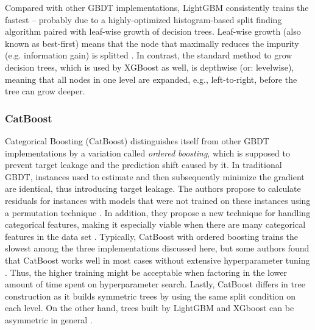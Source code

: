 Compared with other GBDT implementations, LightGBM consistently trains the fastest \parencite[1951--1954]{bentejac_comparative_2021} -- probably due to a highly-optimized histogram-based split finding algorithm paired with leaf-wise growth of decision trees. Leaf-wise growth (also known as best-first) means that the node that maximally reduces the impurity (e.g. information gain) is splitted \parencite[3]{shi_best-first_2007}. In contrast, the standard method to grow decision trees, which is used by XGBoost as well, is depthwise (or: levelwise), meaning that all nodes in one level are expanded, e.g., left-to-right, before the tree can grow deeper. 

\subsubsection{CatBoost}

Categorical Boosting (CatBoost) distinguishes itself from other GBDT implementations by a variation called \textit{ordered boosting}, which is supposed to prevent target leakage and the prediction shift caused by it. In traditional GBDT, instances used to estimate and then subsequently minimize the gradient are identical, thus introducing target leakage. The authors propose to calculate residuals for instances with models that were not trained on these instances using a permutation technique \parencites[5]{prokhorenkova_catboost_2017}[1943--1944]{bentejac_comparative_2021}. In addition, they propose a new technique for handling categorical features, making it especially viable when there are many categorical features in the data set \parencite[1]{prokhorenkova_catboost_2017}. Typically, CatBoost with ordered boosting trains the slowest among the three implementations discussed here, but some authors found that CatBoost works well in most cases without extensive hyperparameter tuning \parencite[26]{florek_benchmarking_2023}. Thus, the higher training might be acceptable when factoring in the lower amount of time spent on hyperparameter search. Lastly, CatBoost differs in tree construction as it builds symmetric trees by using the same split condition on each level. On the other hand, trees built by LightGBM and XGboost can be asymmetric in general \parencite[8]{florek_benchmarking_2023}.

